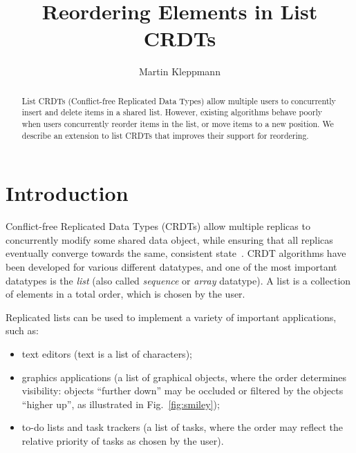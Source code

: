 \documentclass[sigplan,10pt]{acmart}
\begin{document}
\title{Reordering Elements in List CRDTs}

\author{Martin Kleppmann}

\begin{abstract}
    List CRDTs (Conflict-free Replicated Data Types) allow multiple users to concurrently insert and delete items in a shared list.
    However, existing algorithms behave poorly when users concurrently reorder items in the list, or move items to a new position.
    We describe an extension to list CRDTs that improves their support for reordering.
\end{abstract}

\maketitle

\section{Introduction}

Conflict-free Replicated Data Types (CRDTs) allow multiple replicas to concurrently modify some shared data object, while ensuring that all replicas eventually converge towards the same, consistent state~\cite{Shapiro:2011un}.
CRDT algorithms have been developed for various different datatypes, and one of the most important datatypes is the \emph{list} (also called \emph{sequence} or \emph{array} datatype).
A list is a collection of elements in a total order, which is chosen by the user.

Replicated lists can be used to implement a variety of important applications, such as:
\begin{itemize}
    \item text editors (text is a list of characters);
    \item graphics applications (a list of graphical objects, where the order determines visibility: objects ``further down'' may be occluded or filtered by the objects ``higher up'', as illustrated in Fig.~\ref{fig:smiley});
    \item to-do lists and task trackers (a list of tasks, where the order may reflect the relative priority of tasks as chosen by the user).
\end{itemize}
\end{document}

